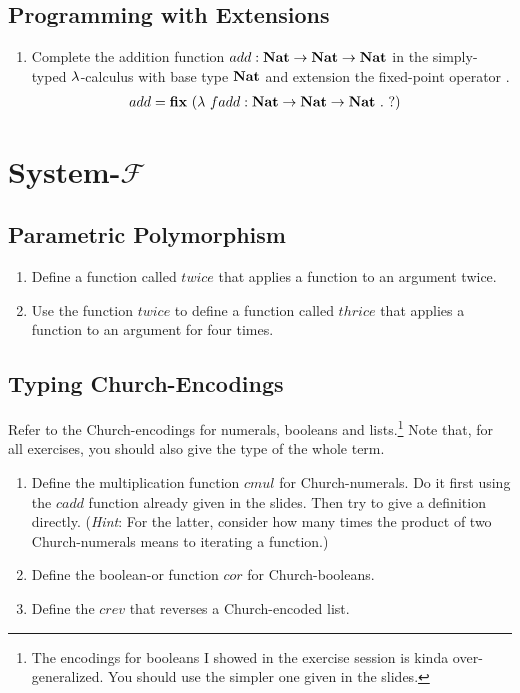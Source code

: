 \documentclass[a4paper,12pt]{article}
\begin{document}
\subsection{Programming with Extensions}

\begin{enumerate}
 \item Complete the addition function $add : \textbf{Nat} \rightarrow \textbf{Nat} \rightarrow \textbf{Nat}$ in the simply-typed
  $\lambda$-calculus with base type $\textbf{Nat}$ and extension the fixed-point operator \fixp.
  \begin{align*}
   add = \fixp\ (& \lamb\ fadd : \NatT \rarr \NatT \rarr \NatT\ .\ ?)
  \end{align*}
\end{enumerate}

\section{System-$\mathcal{F}$}

\subsection{Parametric Polymorphism}

\begin{enumerate}
 \item Define a function called $twice$ that applies a function to an argument twice.
 \item Use the function $twice$ to define a function called $thrice$ that applies a
  function to an argument for four times.
\end{enumerate}

\subsection{Typing Church-Encodings}

Refer to the Church-encodings for numerals, booleans and lists.\footnote{The encodings
for booleans I showed in the exercise session is kinda over-generalized.  You should
use the simpler one given in the slides.}  Note that, for all exercises, you should also
give the type of the whole term.

\begin{enumerate}
 \item Define the multiplication function $cmul$ for Church-numerals.  Do it first using
 the $cadd$ function already given in the slides.  Then try to give a definition directly.
 (\emph{Hint}: For the latter, consider how many times the product of two Church-numerals
 means to iterating a function.)
 \item Define the boolean-or function $cor$ for Church-booleans.
 \item Define the $crev$ that reverses a Church-encoded list.
\end{enumerate}
\end{document}
